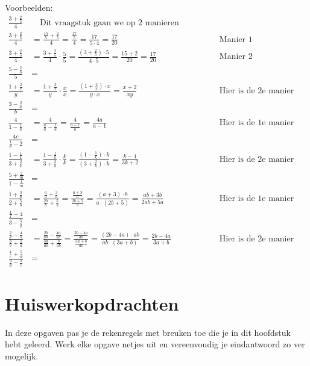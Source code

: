 Voorbeelden:
\begin{align*}
\frac{3+\frac{2}{5}}{4} &\quad \text{Dit vraagstuk gaan we op 2 manieren aanpakken:} \\[0.5em]
\frac{3+\frac{2}{5}}{4} &= \frac{\frac{15}{5}+\frac{2}{5}}{4} = \frac{\frac{17}{5}}{4} = \frac{17}{5 \cdot 4} = \frac{17}{20} & &\text{Manier 1} \\[1em]
\frac{3+\frac{2}{5}}{4} &= \frac{3+\frac{2}{5}}{4} \cdot \frac{5}{5} = \frac{(3+\frac{2}{5}) \cdot 5}{4 \cdot 5} = \frac{15+2}{20} = \frac{17}{20} & &\text{Manier 2} \\[1em]
\frac{5-\frac{2}{3}}{5} &= \\[1em]
\frac{1+\frac{2}{x}}{y} &= \frac{1+\frac{2}{x}}{y} \cdot \frac{x}{x} = \frac{(1+\frac{2}{x}) \cdot x}{y \cdot x} = \frac{x+2}{xy} & &\text{Hier is de 2e manier toegepast} \\[1em]
\frac{3-\frac{2}{a}}{b} &= \\[1em]
\frac{4}{1-\frac{1}{a}} &= \frac{4}{\frac{a}{a}-\frac{1}{a}} = \frac{4}{\frac{a-1}{a}} = \frac{4a}{a-1} & &\text{Hier is de 1e manier toegepast} \\[1em]
\frac{4c}{\frac{1}{d}-2} &= \\[1em]
\frac{1-\frac{1}{k}}{3+\frac{2}{k}} &= \frac{1-\frac{1}{k}}{3+\frac{2}{k}} \cdot \frac{k}{k} = \frac{(1-\frac{1}{k}) \cdot k}{(3+\frac{2}{k}) \cdot k} = \frac{k-1}{3k+2} & &\text{Hier is de 2e manier toegepast} \\[1em]
\frac{5+\frac{2}{m}}{1-\frac{1}{m}} &= \\[1em]
\frac{1+\frac{3}{a}}{2+\frac{5}{b}} &= \frac{\frac{a}{a}+\frac{3}{a}}{\frac{2b}{b}+\frac{5}{b}} = \frac{\frac{a+3}{a}}{\frac{2b+5}{b}} = \frac{(a+3) \cdot b}{a \cdot (2b+5)} = \frac{ab+3b}{2ab+5a} & &\text{Hier is de 1e manier toegepast} \\[1em]
\frac{\frac{1}{x}-4}{3-\frac{5}{y}} &= \\[1em]
\frac{\frac{2}{a}-\frac{4}{b}}{\frac{3}{b}+\frac{1}{a}} &= \frac{\frac{2b}{ab}-\frac{4a}{ab}}{\frac{3a}{ab}+\frac{b}{ab}} = \frac{\frac{2b-4a}{ab}}{\frac{3a+b}{ab}} = \frac{(2b-4a) \cdot ab}{ab \cdot (3a+b)} = \frac{2b-4a}{3a+b} & &\text{Hier is de 2e manier toegepast} \\[1em]
\frac{\frac{4}{c}+\frac{5}{d}}{\frac{3}{d}-\frac{1}{c}} &=
\end{align*}

\section{Huiswerkopdrachten}
In deze opgaven pas je de rekenregels met breuken toe die je in dit hoofdstuk hebt geleerd. Werk elke opgave netjes uit en vereenvoudig je eindantwoord zo ver mogelijk.

